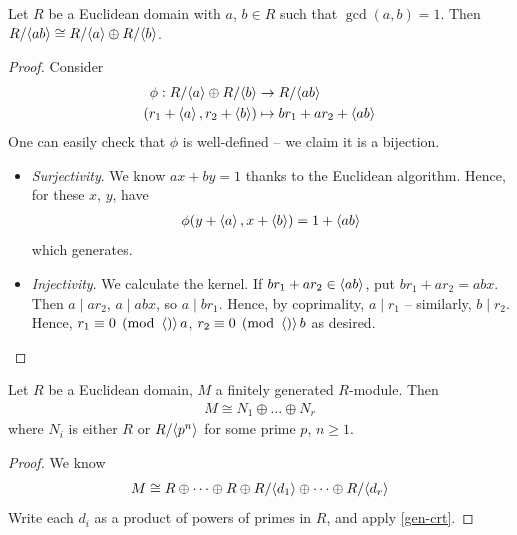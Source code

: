 \documentclass{../../template/note}
\begin{document}
    \begin{proposition}
        \label{gen-crt}
        Let $R$ be a Euclidean domain with $a$, $b \in R$ such that $\gcd(a, b) = 1$. Then $R/\!\left \langle ab \right \rangle \cong R/\!\left \langle a \right \rangle \oplus R/\!\left \langle b \right \rangle$.
    \end{proposition}
    
    \begin{proof}
        Consider
        \begin{align*}
            \phi: R/\!\left \langle a \right \rangle \oplus R/\!\left \langle b \right \rangle &\to R/\!\left \langle ab \right \rangle \\
            (r_1 + \left \langle a \right \rangle, r_2 + \left \langle b \right \rangle) &\mapsto br_1 + ar_2 + \left \langle ab \right \rangle
        \end{align*}
        One can easily check that $\phi$ is well-defined -- we claim it is a bijection.
        \begin{itemize}
            \item \emph{Surjectivity}. We know $ax+by=1$ thanks to the Euclidean algorithm. Hence, for these $x$, $y$, have
            \begin{align*}
                \phi(y + \left \langle a \right \rangle, x + \left \langle b \right \rangle) = 1 + \left \langle ab \right \rangle
            \end{align*}
            which generates.
            \item \emph{Injectivity}. We calculate the kernel. If $br_1 + ar_2 \in \left \langle ab \right \rangle$, put $br_1 + ar_2 = abx$. Then $a \mid ar_2$, $a \mid abx$, so $a \mid br_1$. Hence, by coprimality, $a \mid r_1$ -- similarly, $b \mid r_2$. Hence, $r_1 \equiv 0 \pmod \gen a$, $r_2 \equiv 0 \pmod \gen b$ as desired.            
        \end{itemize}
    \end{proof}
    
    \begin{theorem}
        Let $R$ be a Euclidean domain, $M$ a finitely generated $R$-module. Then
        \begin{align*}
            M \cong N_1 \oplus \dots \oplus N_r
        \end{align*}
        where $N_i$ is either $R$ or $R/\!\left \langle p^n \right \rangle$ for some prime $p$, $n \geq 1$.
    \end{theorem}
    
    \begin{proof}
        We know
        \begin{align*}
            M \cong R \oplus \dots \oplus R \oplus R/\!\left \langle d_1 \right \rangle \oplus \dots \oplus R/\!\left \langle d_r \right \rangle
        \end{align*}
        Write each $d_i$ as a product of powers of primes in $R$, and apply \cref{gen-crt}.        
    \end{proof}
    
\end{document}
